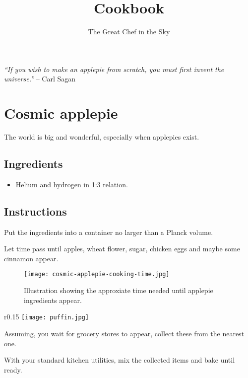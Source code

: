 \documentclass[11pt]{article}
\title{Cookbook}
\author{The Great Chef in the Sky}
\begin{document}
\maketitle

\begin{displayquote}
\emph{``If you wish to make an applepie from scratch, you must first invent the universe.''}
-- Carl Sagan
\end{displayquote}


\tableofcontents
\pagebreak

\section{Cosmic applepie}

The world is big and wonderful, especially when applepies exist.

\subsection*{Ingredients}

\begin{itemize}
\item Helium and hydrogen in 1:3 relation.
\end{itemize}

\subsection*{Instructions}

Put the ingredients into a container no larger than a Planck volume.

Let time pass until apples, wheat flower, sugar, chicken eggs and maybe some cinnamon appear.

\begin{figure}[h]
\centering
\texttt{[image: cosmic-applepie-cooking-time.jpg]}
\caption{Illustration showing the approxiate time needed until applepie ingredients appear.}
\end{figure}

\begin{wrapfigure}{r}{0.15\textwidth}
    \centering
    \texttt{[image: puffin.jpg]}
\end{wrapfigure}

Assuming, you wait for grocery stores to appear, collect these from the nearest one.

With your standard kitchen utilities, mix the collected items and bake until ready.
\end{document}
